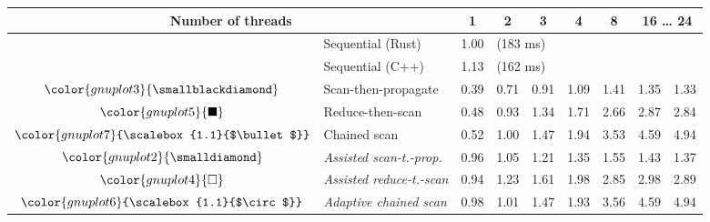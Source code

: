\begin{tabular}{clrrrrrrr}
\toprule
\multicolumn{2}{c}{\textbf{Number of threads}} & \multicolumn{1}{c}{\textbf{ 1 }} & \multicolumn{1}{c}{\textbf{ 2 }} & \multicolumn{1}{c}{\textbf{ 3 }} & \multicolumn{1}{c}{\textbf{ 4 }} & \multicolumn{1}{c}{\textbf{ 8 }} & \multicolumn{2}{c}{\textbf{ 16 } \dots \textbf{ 24 }} \\
\midrule
& Sequential (Rust) & \multicolumn{1}{r}{ 1.00 } & \multicolumn{ 6 }{l}{(183 ms)} \\
& Sequential (C++) & \multicolumn{1}{r}{ 1.13 } & \multicolumn{ 6 }{l}{(162 ms)} \\
\rowcolor{gnuplot3!10}$\color{gnuplot3}{\smallblackdiamond}$ & Scan-then-propagate & \cellcolor{gnuplot3!10} 0.39 & \cellcolor{gnuplot3!10} 0.71 & \cellcolor{gnuplot3!10} 0.91 & \cellcolor{gnuplot3!10} 1.09 & \cellcolor{gnuplot3!10} 1.41 & \cellcolor{gnuplot3!10} 1.35 & \cellcolor{gnuplot3!10} 1.33 \\
\rowcolor{gnuplot5!10}$\color{gnuplot5}{\blacksquare}$ & Reduce-then-scan & \cellcolor{gnuplot5!10} 0.48 & \cellcolor{gnuplot5!10} 0.93 & \cellcolor{gnuplot5!10} 1.34 & \cellcolor{gnuplot5!10} 1.71 & \cellcolor{gnuplot5!10} 2.66 & \cellcolor{gnuplot5!10} 2.87 & \cellcolor{gnuplot5!10} 2.84 \\
\rowcolor{gnuplot7!10}$\color{gnuplot7}{\scalebox{1.1}{$\bullet$}}$ & Chained scan & \cellcolor{gnuplot7!10} 0.52 & \cellcolor{gnuplot7!10} 1.00 & \cellcolor{gnuplot7!10} 1.47 & \cellcolor{gnuplot7!10} 1.94 & \cellcolor{gnuplot7!10} 3.53 & \cellcolor{gnuplot7!10} 4.59 & \cellcolor{gnuplot7!10} 4.94 \\
\rowcolor{gnuplot2!30}$\color{gnuplot2}{\smalldiamond}$ & \textit{Assisted scan-t.-prop.} & \cellcolor{gnuplot2!30} 0.96 & \cellcolor{gnuplot2!30} 1.05 & \cellcolor{gnuplot2!30} 1.21 & \cellcolor{gnuplot2!30} 1.35 & \cellcolor{gnuplot2!30} 1.55 & \cellcolor{gnuplot2!30} 1.43 & \cellcolor{gnuplot2!30} 1.37 \\
\rowcolor{gnuplot4!30}$\color{gnuplot4}{\square}$ & \textit{Assisted reduce-t.-scan} & \cellcolor{gnuplot4!30} 0.94 & \cellcolor{gnuplot4!30} 1.23 & \cellcolor{gnuplot4!30} 1.61 & \cellcolor{gnuplot4!30} 1.98 & \cellcolor{gnuplot4!30} 2.85 & \cellcolor{gnuplot4!30} 2.98 & \cellcolor{gnuplot4!30} 2.89 \\
\rowcolor{gnuplot6!30}$\color{gnuplot6}{\scalebox{1.1}{$\circ$}}$ & \textit{Adaptive chained scan} & \cellcolor{gnuplot6!30} 0.98 & \cellcolor{gnuplot6!30} 1.01 & \cellcolor{gnuplot6!30} 1.47 & \cellcolor{gnuplot6!30} 1.93 & \cellcolor{gnuplot6!30} 3.56 & \cellcolor{gnuplot6!30} 4.59 & \cellcolor{gnuplot6!30} 4.94 \\

\end{tabular}
